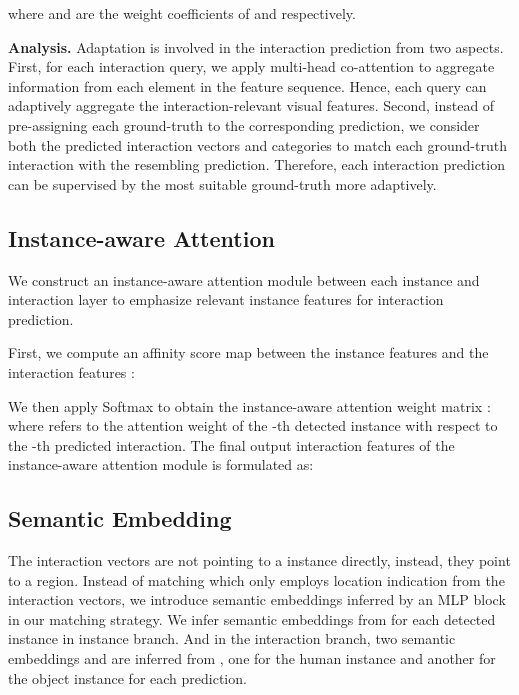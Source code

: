 \documentclass[final]{cvpr}
\begin{document}
where  and  are the weight coefficients of  and  respectively.

\vspace{0.5mm}\noindent\textbf{Analysis.}
Adaptation is involved in the interaction prediction from two aspects.
First, for each interaction query, we apply multi-head co-attention to aggregate information from each element in the feature sequence. Hence, each query can adaptively aggregate the interaction-relevant visual features. 
Second, instead of pre-assigning each ground-truth to the corresponding prediction, we consider both the predicted interaction vectors and categories to match each ground-truth interaction with the resembling prediction. Therefore, each interaction prediction can be supervised by the most suitable ground-truth more adaptively.

\vspace{-1.5mm}\subsection{Instance-aware Attention} \label{sec:IA}\vspace{-1mm}
We construct an instance-aware attention module between each instance and interaction layer to emphasize relevant instance features for interaction prediction. 

First, we compute an affinity score map  between the instance features  and the interaction features :

We then apply Softmax to obtain the instance-aware attention weight matrix :
where  refers to the attention weight of the -th detected instance with respect to the -th predicted interaction. The final output interaction features  of the instance-aware attention module is formulated as:


\vspace{-1.5mm}\subsection{Semantic Embedding} \label{sec:se}\vspace{-1mm}
The interaction vectors are not pointing to a instance directly, instead, they point to a region. Instead of matching which only employs location indication from the interaction vectors, we introduce semantic embeddings inferred by an MLP block in our matching strategy. We infer semantic embeddings  from  for each detected instance in instance branch. And in the interaction branch, two semantic embeddings  and  are inferred from , one for the human instance and another for the object instance for each prediction. 
\end{document}
